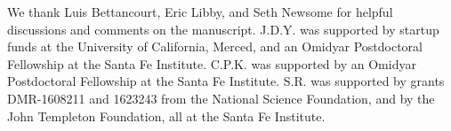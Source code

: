 \documentclass{pnastwo}
\begin{document}
\begin{article}


%
%



%


 

 
%
%
%
%
%





\begin{acknowledgments}
  We thank Luis Bettancourt, Eric Libby, and Seth Newsome for helpful
  discussions and comments on the manuscript.  J.D.Y. was supported by
  startup funds at the University of California, Merced, and an Omidyar
  Postdoctoral Fellowship at the Santa Fe Institute.  C.P.K. was supported by
  an Omidyar Postdoctoral Fellowship at the Santa Fe Institute.  S.R. was
  supported by grants DMR-1608211 and 1623243 from the National Science
  Foundation, and by the John Templeton Foundation, all at the Santa Fe
  Institute.
\end{acknowledgments}






\end{article}
\end{document}
